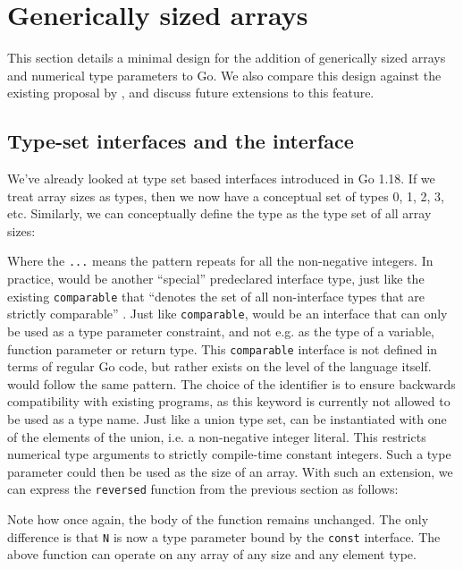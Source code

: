 \section{Generically sized arrays}

This section details a minimal design for the addition of generically sized
arrays and numerical type parameters to Go. We also compare this design against
the existing proposal by \autocite{goArrayProposal}, and discuss future
extensions to this feature.

\subsection{Type-set interfaces and the  interface}

We've already looked at type set based interfaces introduced in Go 1.18. If we
treat array sizes as types, then we now have a conceptual set of types 0, 1, 2,
3, etc. Similarly, we can conceptually define the  type as the type
set of all array sizes:


Where the \texttt{...} means the pattern repeats for all the non-negative
integers. In practice,  would be another ``special'' predeclared
interface type, just like the existing \texttt{comparable} that ``denotes the
set of all non-interface types that are strictly comparable'' \autocite{spec}.
Just like \texttt{comparable},  would be an interface that can only be
used as a type parameter constraint, and not e.g. as the type of a variable,
function parameter or return type. This \texttt{comparable} interface is not
defined in terms of regular Go code, but rather exists on the level of the
language itself.  would follow the same pattern. The choice of the
identifier  is to ensure backwards compatibility with existing
programs, as this keyword is currently not allowed to be used as a type name.
Just like a union type set,  can be instantiated with one of the
elements of the union, i.e. a non-negative integer literal. This restricts
numerical type arguments to strictly compile-time constant integers. Such a type
parameter could then be used as the size of an array. With such an extension, we
can express the \texttt{reversed} function from the previous section as follows:


Note how once again, the body of the function remains unchanged. The only
difference is that \texttt{N} is now a type parameter bound by the
\texttt{const} interface. The above function can operate on any array of any
size and any element type.

